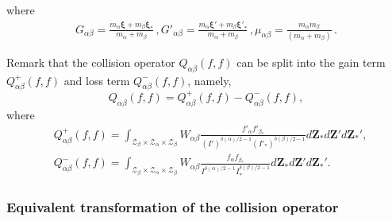 \documentclass[reqno,11pt]{amsart}
\numberwithin{equation}{section}
\begin{document}
where 
\begin{equation*}
    \begin{aligned}
        G_{\alpha \beta } =\tfrac{m_\alpha \mathbf{\xi } + m_\beta \mathbf{\xi }_*}{m_\alpha + m_\beta}\,, G'_{\alpha \beta } =\tfrac{m_\alpha \mathbf{\xi' } + m_\beta \mathbf{\xi' }_*}{m_\alpha + m_\beta} \,, \mu _{\alpha \beta }= \tfrac{m_\alpha m_\beta }{(m_\alpha + m_\beta )} \,.
    \end{aligned}
\end{equation*}

Remark that the collision operator $Q_{\alpha \beta }(f,f)$ can be split into the gain term $Q^+_{\alpha \beta } (f,f)$ and loss term $Q^-_{\alpha \beta } (f,f)$, namely,
\begin{equation*}
	Q_{\alpha \beta } (f,f) =Q^+_{\alpha \beta } (f,f) -Q^-_{\alpha \beta } (f,f),
\end{equation*}
where
\begin{equation*}
	\begin{aligned}
		& Q^+_{\alpha \beta } (f,f) = \int_{\mathcal{Z}_\beta \times \mathcal{Z}_\alpha \times \mathcal{Z}_\beta} W_{\alpha \beta } \tfrac{f'_\alpha f'_{\beta_*}}{(I')^{\delta(\alpha)/2-1} (I'_* )^{\delta(\beta)/2-1}} d \mathbf{Z}_* d \mathbf{Z}' d \mathbf{Z}_*', \\
		& Q^-_{\alpha \beta } (f,f) =\int_{\mathcal{Z}_\beta \times \mathcal{Z}_\alpha \times \mathcal{Z}_\beta} W_{\alpha \beta }
		\tfrac{f_\alpha f_{\beta_*}}{I^{\delta(\alpha)/2-1} I_* ^{\delta(\beta)/2-1}} d \mathbf{Z}_* d \mathbf{Z}' d \mathbf{Z}_*' .
	\end{aligned}
\end{equation*}

\subsubsection{Equivalent transformation of the collision operator}
\end{document}
